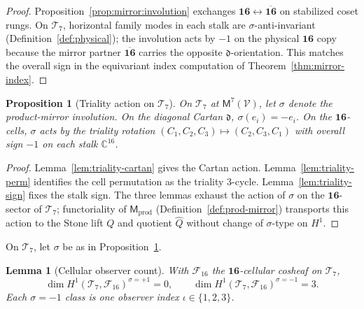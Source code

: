 \documentclass[aps,prd,onecolumn,amsmath,amssymb,nofootinbib,11pt]{revtex4-2}
\numberwithin{equation}{section}
\theoremstyle{plain}
\newtheorem{lemma}[theorem]{Lemma}
\newtheorem{proposition}[theorem]{Proposition}
\theoremstyle{definition}
\theoremstyle{remark}
\newcommand{\C}{\mathbb{C}}
\newcommand{\Void}{\mathcal{V}}
\newcommand{\Mirror}{\mathsf{M}}
\begin{document}
\begin{proof}
Proposition~\ref{prop:mirror:involution} exchanges
$\mathbf{16}\leftrightarrow\overline{\mathbf{16}}$ on stabilized coset rungs.
On $\mathcal{T}_7$, horizontal family modes in each stalk are
$\sigma$-anti-invariant (Definition~\ref{def:physical}); the involution acts by
$-1$ on the physical $\mathbf{16}$ copy because the mirror partner
$\overline{\mathbf{16}}$ carries the opposite $\mathfrak{d}$-orientation. This
matches the overall sign in the equivariant index computation of
Theorem~\ref{thm:mirror-index}.
\end{proof}

\begin{proposition}[Triality action on $\mathcal{T}_7$]\label{prop:triality}
On $\mathcal{T}_7$ at $\Mirror^7(\Void)$, let $\sigma$ denote the product-mirror
involution. On the diagonal Cartan $\mathfrak{d}$,
$\sigma(e_i)=-e_i$. On the $\mathbf{16}$-cells,
$\sigma$ acts by the triality rotation $(C_1,C_2,C_3)\mapsto(C_2,C_3,C_1)$
with overall sign $-1$ on each stalk $\C^{16}$.
\end{proposition}

\begin{proof}
Lemma~\ref{lem:triality-cartan} gives the Cartan action.
Lemma~\ref{lem:triality-perm} identifies the cell permutation as the triality
$3$-cycle. Lemma~\ref{lem:triality-sign} fixes the stalk sign.
The three lemmas exhaust the action of $\sigma$ on the
$\mathbf{16}$-sector of $\mathcal{T}_7$; functoriality of
$\Mirror_{\mathrm{prod}}$ (Definition~\ref{def:prod-mirror}) transports this
action to the Stone lift $Q$ and quotient $\hat Q$ without change of
$\sigma$-type on $H^1$.
\end{proof}

On $\mathcal{T}_7$, let $\sigma$ be as in Proposition~\ref{prop:triality}.

\begin{lemma}[Cellular observer count]\label{lem:cellular}
With $\mathcal{F}_{16}$ the $\mathbf{16}$-cellular cosheaf on $\mathcal{T}_7$,
\begin{equation}\label{eq:cellular}
  \dim H^1(\mathcal{T}_7,\mathcal{F}_{16})^{\sigma=+1}=0,
  \qquad
  \dim H^1(\mathcal{T}_7,\mathcal{F}_{16})^{\sigma=-1}=3.
\end{equation}
Each $\sigma=-1$ class is one observer index $\iota\in\{1,2,3\}$.
\end{lemma}
\end{document}
